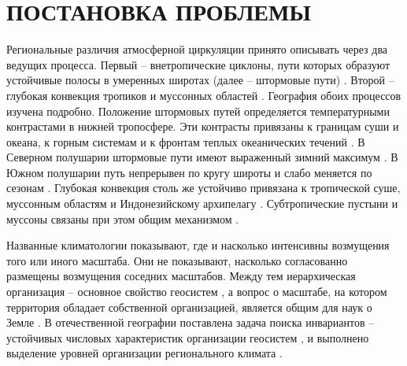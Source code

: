 \documentclass[12pt,a4paper]{article}
\begin{document}
\section{ПОСТАНОВКА ПРОБЛЕМЫ}

Региональные различия атмосферной циркуляции принято описывать через два ведущих процесса. Первый -- внетропические циклоны, пути которых образуют устойчивые полосы в умеренных широтах (далее -- штормовые пути) \cite{HoskinsValdes1990,Chang2002,HoskinsHodges2005,Shaw2016}. Второй -- глубокая конвекция тропиков и муссонных областей \cite{Houze2004,Feng2021}. География обоих процессов изучена подробно. Положение штормовых путей определяется температурными контрастами в нижней тропосфере. Эти контрасты привязаны к границам суши и океана, к горным системам и к фронтам теплых океанических течений \cite{HoskinsValdes1990,Shaw2016}. В Северном полушарии штормовые пути имеют выраженный зимний максимум \cite{Chang2002}. В Южном полушарии путь непрерывен по кругу широты и слабо меняется по сезонам \cite{Trenberth1991}. Глубокая конвекция столь же устойчиво привязана к тропической суше, муссонным областям и Индонезийскому архипелагу \cite{NealeSlingo2003,Feng2021}. Субтропические пустыни и муссоны связаны при этом общим механизмом \cite{RodwellHoskins1996}.

Названные климатологии показывают, где и насколько интенсивны возмущения того или иного масштаба. Они не показывают, насколько согласованно размещены возмущения соседних масштабов. Между тем иерархическая организация -- основное свойство геосистем \cite{Sochava1978,Bertrand1968,Simon1962}, а вопрос о масштабе, на котором территория обладает собственной организацией, является общим для наук о Земле \cite{Levin1992,WuLoucks1995}. В отечественной географии поставлена задача поиска инвариантов -- устойчивых числовых характеристик организации геосистем \cite{Puzachenko1986,Puzachenko2004,Puzachenko2010}, и выполнено выделение уровней организации регионального климата \cite{Krenke2019}.
\end{document}

